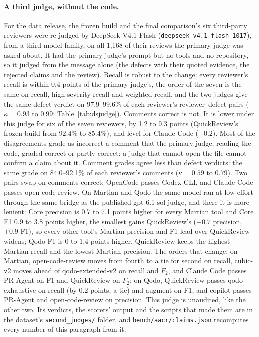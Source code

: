 \documentclass[11pt,a4paper]{article}
\newcommand{\qcr}{QuickReview}
\newcommand{\code}[1]{\texttt{#1}}
\begin{document}
\paragraph{A third judge, without the code.} For the data release, the
frozen build and the final comparison's six third-party reviewers were
re-judged by DeepSeek V4.1 Flash (\code{deepseek-v4.1-flash-1017}), from a
third model family, on all 1{,}168 of their reviews the primary judge was
asked about. It had the primary judge's prompt but no tools and no
repository, so it judged from the message alone (the defects with their
quoted evidence, the rejected claims and the review). Recall is robust to
the change: every reviewer's recall is within 0.4 points of the primary
judge's, the order of the seven is the same on recall, high-severity recall
and weighted recall, and the two judges give the same defect verdict on
97.9--99.6\% of each reviewer's reviewer--defect pairs ($\kappa = 0.93$ to
$0.99$; Table~\ref{tab:dsjudge}). Comments correct is not. It is lower under
this judge for six of the seven reviewers, by 1.2 to 9.3 points (\qcr{}'s
frozen build from 92.4\% to 85.4\%), and level for Claude Code ($+0.2$).
Most of the disagreements grade as incorrect a comment that the primary
judge, reading the code, graded correct or partly correct: a judge that
cannot open the file cannot confirm a claim about it. Comment grades agree
less than defect verdicts: the same grade on 84.0--92.1\% of each
reviewer's comments ($\kappa = 0.59$ to $0.79$). Two pairs swap on
comments correct: OpenCode passes Codex CLI, and Claude Code passes
open-code-review. On Martian and Qodo the same model ran at low effort
through the same bridge as the published gpt-6.1-sol judge, and there it
is more lenient: Core precision is 0.7 to 7.1 points
higher for every Martian tool and Core F1 0.9 to 3.8
points higher, the smallest gains \qcr{}'s ($+0.7$ precision,
$+0.9$ F1), so every other tool's Martian precision and F1 lead over
\qcr{} widens; Qodo F1 is 0 to 1.4 points higher.
\qcr{} keeps the highest Martian recall and the lowest Martian precision.
The orders that change: on Martian, open-code-review moves from fourth to a
tie for second on recall, cubic-v2 moves ahead of qodo-extended-v2 on recall
and $F_2$, and Claude Code passes PR-Agent on F1 and \qcr{} on $F_2$; on
Qodo, \qcr{} passes qodo-exhaustive on recall (by 0.2 points, a tie) and
augment on F1, and copilot passes PR-Agent and open-code-review on
precision. This judge is unaudited, like the other two. Its verdicts, the
scorers' output and the scripts that made them are in the dataset's
\code{second\_judges/} folder, and \code{bench/aacr/claims.json} recomputes
every number of this paragraph from it.
\end{document}
